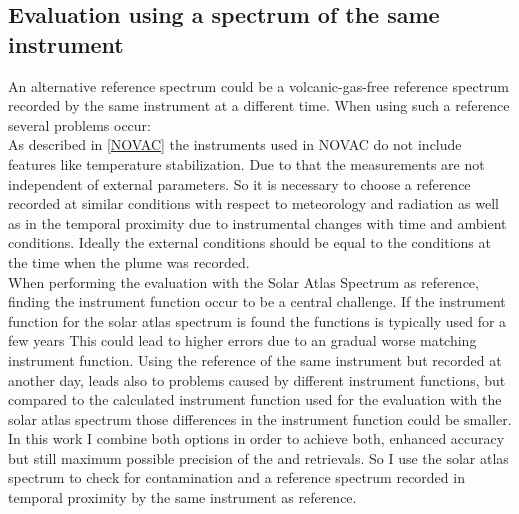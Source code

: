 %
\subsection*{Evaluation using a spectrum of the same instrument}
An alternative reference spectrum could be a volcanic-gas-free reference
spectrum recorded by the same instrument at a different time. When using such a reference several problems occur:\\
As described in \cref{NOVAC} the instruments used in NOVAC do not include features like temperature stabilization. Due to that the measurements are not independent of external parameters. 
So it is necessary to choose a reference recorded at similar conditions with respect to meteorology and	radiation as well as in the temporal proximity due to instrumental changes with time and ambient conditions. Ideally the external conditions should be equal to the conditions at the time when the plume was recorded.\\
%
When performing the evaluation with the Solar Atlas Spectrum as reference, finding the instrument function occur to be a central challenge. If the instrument function for the solar atlas spectrum is found the functions is typically used for a few years This could lead to higher errors due to an gradual worse matching instrument function.
Using the reference of the same instrument but recorded at another day, leads also to problems caused by different instrument functions, but compared to the calculated instrument function used for the evaluation with the solar atlas spectrum those differences in the instrument function could be smaller.
\\
In this work I combine both options in order to
achieve both, enhanced accuracy but still maximum possible precision of
the  and  retrievals. So I use the solar atlas spectrum to check for 
contamination and a reference spectrum recorded in temporal proximity by the same instrument as reference.\\
